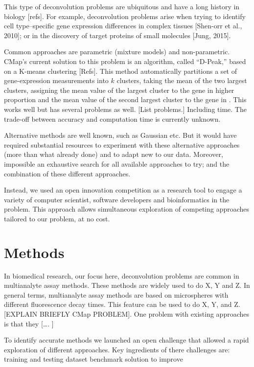 \documentclass[]{article}
\begin{document}
This type of deconvolution problems are ubiquitous and have a long
history in biology {[}refs{]}. For example, deconvolution problems arise
when trying to identify cell type--specific gene expression differences
in complex tissues {[}Shen-orr et al., 2010{]}; or in the discovery of
target proteins of small molecules {[}Jung, 2015{]}.

Common approaches are parametric (mixture models) and non-parametric.
CMap's current solution to this problem is an algorithm, called
``D-Peak,'' based on a K-means clustering {[}Refs{]}. This method
automatically partitions a set of gene-expression measurements into
\(k\) clusters, taking the mean of the two largest clusters, assigning
the mean value of the largest cluster to the gene in higher proportion
and the mean value of the second largest cluster to the gene in . This
works well but has several problems as well. {[}List problems.{]}
Including time. The trade-off between accuracy and computation time is
currently unknown.

Alternative methods are well known, such as Gaussian etc. But it would
have required substantial resources to experiment with these alternative
approaches (more than what already done) and to adapt new to our data.
Moreover, impossible an exhaustive search for all available approaches
to try; and the combination of these different approaches.

Instead, we used an open innovation competition as a research tool to
engage a variety of computer scientist, software developers and
bioinformatics in the problem. This approach allows simultaneous
exploration of competing approaches tailored to our problem, at no cost.

\hypertarget{methods}{%
\section{Methods}\label{methods}}

In biomedical research, our focus here, deconvolution problems are
common in multianalyte assay methods. These methods are widely used to
do X, Y and Z. In general terms, multianalyte assay methods are based on
microspheres with different fluorescence decay times. This feature can
be used to do X, Y, and Z. {[}EXPLAIN BRIEFLY CMap PROBLEM{]}. One
problem with existing approaches is that they {[}\ldots{}. {]}

To identify accurate methods we launched an open challenge that allowed
a rapid exploration of different approaches. Key ingredients of there
challenges are: training and testing dataset benchmark solution to
improve
\end{document}
